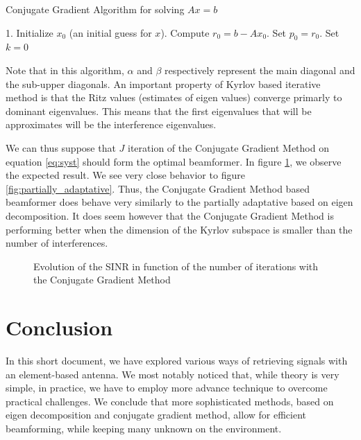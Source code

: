 \documentclass[12pt]{article}
\begin{document}
\begin{algorithm}[H]
\SetNlSty{}{}{}

\caption{Conjugate Gradient Algorithm for solving \(Ax = b\)}
\BlankLine

1. Initialize \(x_0\) (an initial guess for \(x\)). Compute \(r_0 = b - Ax_0\). Set \(p_0 = r_0\). Set \(k = 0\)\;

\end{algorithm}

Note that in this algorithm, $\alpha$ and $\beta$ respectively represent the main diagonal and the sub-upper diagonals. An important property of Kyrlov based iterative method is that the Ritz values (estimates of eigen values) converge primarly to dominant eigenvalues. This means that the first eigenvalues that will be approximates will be the interference eigenvalues. 

We can thus suppose that $J$ iteration of the Conjugate Gradient Method on equation \ref{eq:syst} should form the optimal beamformer. In figure \ref{fig:mvdr_cg}, we observe the expected result. We see very close behavior to figure \ref{fig:partially_adaptative}. Thus, the Conjugate Gradient Method based beamformer does behave very similarly to the partially adaptative based on eigen decomposition. It does seem however that the Conjugate Gradient Method is performing better when the dimension of the Kyrlov subspace is smaller than the number of interferences.

\begin{figure}[H]
    \centering
    
    \caption{Evolution of the SINR in function of the number of iterations with the Conjugate Gradient Method}
    \label{fig:mvdr_cg}
\end{figure}

\section{Conclusion}
In this short document, we have explored various ways of retrieving signals with an element-based antenna. We most notably noticed that, while theory is very simple, in practice, we have to employ more advance technique to overcome practical challenges. We conclude that more sophisticated methods, based on eigen decomposition and conjugate gradient method, allow for efficient beamforming, while keeping many unknown on the environment.
\end{document}
